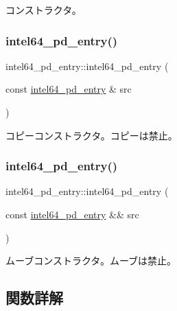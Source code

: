 コンストラクタ。 \hypertarget{classintel64__pd__entry_a7e75916f391496e280a48a2e0975c256}{}\label{classintel64__pd__entry_a7e75916f391496e280a48a2e0975c256} 
\subsubsection{\texorpdfstring{intel64\+\_\+pd\+\_\+entry()}{intel64\_pd\_entry()}\hspace{0.1cm}{\footnotesize\ttfamily [2/3]}}
{\footnotesize\ttfamily intel64\+\_\+pd\+\_\+entry\+::intel64\+\_\+pd\+\_\+entry (\begin{DoxyParamCaption}\item[{const \hyperlink{classintel64__pd__entry}{intel64\+\_\+pd\+\_\+entry} \&}]{src }\end{DoxyParamCaption})\hspace{0.3cm}{\ttfamily [delete]}}

コピーコンストラクタ。コピーは禁止。 \hypertarget{classintel64__pd__entry_a8d283c7b74a47f7ea2b0401e62c9c1f5}{}\label{classintel64__pd__entry_a8d283c7b74a47f7ea2b0401e62c9c1f5} 
\subsubsection{\texorpdfstring{intel64\+\_\+pd\+\_\+entry()}{intel64\_pd\_entry()}\hspace{0.1cm}{\footnotesize\ttfamily [3/3]}}
{\footnotesize\ttfamily intel64\+\_\+pd\+\_\+entry\+::intel64\+\_\+pd\+\_\+entry (\begin{DoxyParamCaption}\item[{const \hyperlink{classintel64__pd__entry}{intel64\+\_\+pd\+\_\+entry} \&\&}]{src }\end{DoxyParamCaption})\hspace{0.3cm}{\ttfamily [delete]}}

ムーブコンストラクタ。ムーブは禁止。 

\subsection{関数詳解}
\hypertarget{classintel64__pd__entry_ac43293f1913f7b0defc09fddc4d41c42}{}\label{classintel64__pd__entry_ac43293f1913f7b0defc09fddc4d41c42} 
